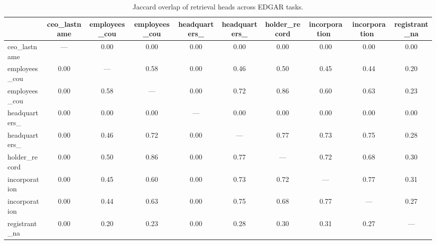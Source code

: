 \begin{table}[h]
\centering
\begin{tabular}{lccccccccc}
\toprule
 & ceo\_lastname & employees\_cou & employees\_cou & headquarters\_ & headquarters\_ & holder\_record & incorporation\ & incorporation\ & registrant\_na \\
\midrule
ceo\_lastname & --- & 0.00 & 0.00 & 0.00 & 0.00 & 0.00 & 0.00 & 0.00 & 0.00 \\
employees\_cou & 0.00 & --- & 0.58 & 0.00 & 0.46 & 0.50 & 0.45 & 0.44 & 0.20 \\
employees\_cou & 0.00 & 0.58 & --- & 0.00 & 0.72 & 0.86 & 0.60 & 0.63 & 0.23 \\
headquarters\_ & 0.00 & 0.00 & 0.00 & --- & 0.00 & 0.00 & 0.00 & 0.00 & 0.00 \\
headquarters\_ & 0.00 & 0.46 & 0.72 & 0.00 & --- & 0.77 & 0.73 & 0.75 & 0.28 \\
holder\_record & 0.00 & 0.50 & 0.86 & 0.00 & 0.77 & --- & 0.72 & 0.68 & 0.30 \\
incorporation\ & 0.00 & 0.45 & 0.60 & 0.00 & 0.73 & 0.72 & --- & 0.77 & 0.31 \\
incorporation\ & 0.00 & 0.44 & 0.63 & 0.00 & 0.75 & 0.68 & 0.77 & --- & 0.27 \\
registrant\_na & 0.00 & 0.20 & 0.23 & 0.00 & 0.28 & 0.30 & 0.31 & 0.27 & --- \\
\bottomrule
\end{tabular}
\caption{Jaccard overlap of retrieval heads across EDGAR tasks.}
\label{tab:overlap}
\end{table}